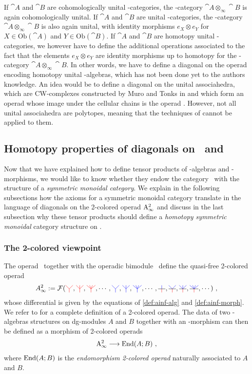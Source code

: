 \documentclass[twoside, 12pt]{amsart}
\theoremstyle{remark}
\begin{document}
If $\cat{A}$ and $\cat{B}$ are cohomologically unital \Ainf -categories, the \Ainf -category $\cat{A} \otimes_\infty \cat{B}$ is again cohomologically unital. 
If $\cat{A}$ and $\cat{B}$ are unital \Ainf -categories, the \Ainf -category $\cat{A} \otimes_\infty \cat{B}$ is also again unital, with identity morphisms $e_X \otimes e_Y$ for  $X \in \mathrm{Ob}(\cat{A})$ and $Y \in \mathrm{Ob}(\cat{B})$.
If $\cat{A}$ and $\cat{B}$ are homotopy unital \Ainf -categories, we however have to define the additional operations associated to the fact that the elements $e_X \otimes e_Y$ are identity morphisms up to homotopy for the \Ainf -category $\cat{A} \otimes_\infty \cat{B}$. In other words, we have to define a diagonal on the operad \uAinf encoding homotopy unital \Ainf -algebras, which has not been done yet to the authors knowledge. An idea would be to define a diagonal on the unital associahedra, which are CW-complexes constructed by Muro and Tonks in \cite{MuroTonks} and which form an operad whose image under the cellular chains is the operad \uAinf . However, not all unital associahedra are polytopes, meaning that the techniques of \cite{MTTV19} cannot be applied to them. 

\subsection{Homotopy properties of diagonals on \Ainf\ and \Minf}

Now that we have explained how to define tensor products of \Ainf -algebras and \Ainf -morphisms, we would like to know whether they endow the category \Aalg\ with the structure of a \textit{symmetric monoidal category}. We explain in the following subsections how the axioms for a symmetric monoidal category translate in the language of diagonals on the 2-colored operad $\mathrm{A}_\infty^2$ and discuss in the last subsection why these tensor products should define a \textit{homotopy symmetric monoidal} category structure on \Aalg .

\subsubsection{The 2-colored viewpoint}

The operad \Ainf\ together with the operadic bimodule \Minf\ define the quasi-free 2-colored operad 
\[ A_\infty^2 := \mathcal{F} (\arbreopdeuxcol{red} , \arbreoptroiscol{red} , \arbreopquatrecol{red}, \cdots, \arbreopdeuxcol{blue} , \arbreoptroiscol{blue} , \arbreopquatrecol{blue} , \cdots, \arbreopunmorph , \arbreopdeuxmorph , \arbreoptroismorph , \arbreopquatremorph , \cdots ) \ , \]
whose differential is given by the equations of \cref{def:ainf-alg} and \cref{def:ainf-morph}.
We refer to \cite{yau-colored} for a complete definition of a 2-colored operad.
The data of two \Ainf -algebras structures on dg-modules $A$ and $B$ together with an \Ainf -morphism can then be defined as a morphism of 2-colored operads
\[ \mathrm{A}_\infty^2 \longrightarrow \mathrm{End} ( A ; B) \ , \]
where $\mathrm{End} ( A ; B)$ is the \textit{endomorphism 2-colored operad} naturally associated to $A$ and $B$.
\end{document}
